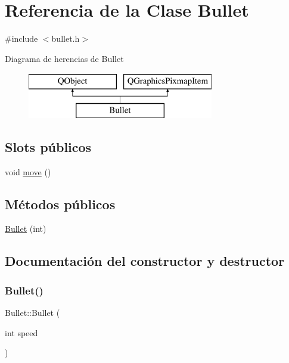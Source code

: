 \hypertarget{class_bullet}{}\section{Referencia de la Clase Bullet}
\label{class_bullet}


{\ttfamily \#include $<$bullet.\+h$>$}

Diagrama de herencias de Bullet\begin{figure}[H]
\begin{center}
\leavevmode
\includegraphics[height=2.000000cm]{class_bullet}
\end{center}
\end{figure}
\subsection*{Slots públicos}
\begin{DoxyCompactItemize}
\item 
void \hyperlink{class_bullet_a6140db968c42c05e829e142f74f20b16}{move} ()
\end{DoxyCompactItemize}
\subsection*{Métodos públicos}
\begin{DoxyCompactItemize}
\item 
\hyperlink{class_bullet_ab0bc0aa71829a6ccd0d488bb61eee065}{Bullet} (int)
\end{DoxyCompactItemize}


\subsection{Documentación del constructor y destructor}
\hypertarget{class_bullet_ab0bc0aa71829a6ccd0d488bb61eee065}{}\label{class_bullet_ab0bc0aa71829a6ccd0d488bb61eee065} 
\subsubsection{\texorpdfstring{Bullet()}{Bullet()}}
{\footnotesize\ttfamily Bullet\+::\+Bullet (\begin{DoxyParamCaption}\item[{int}]{speed }\end{DoxyParamCaption})}



